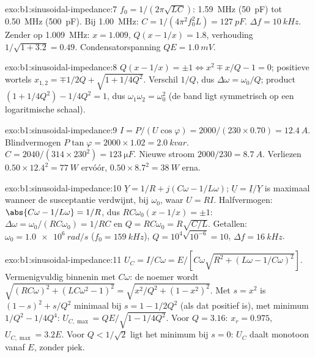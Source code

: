 \begin{solution}{exo:b1:sinusoidal-impedance:7}
$f_0 = 1/(2\pi\sqrt{LC})$: \qty{1.59}{MHz} (\qty{50}{pF}) tot \qty{0.50}{MHz}
(\qty{500}{pF}). Bij \qty{1.00}{MHz}: $C = 1/(4\pi^2f_0^2L) = \qty{127}{pF}$.
$\Delta f = \qty{10}{kHz}$. Zender op \qty{1.009}{MHz}: $x = 1.009$,
$Q(x - 1/x) = 1.8$, verhouding $1/\sqrt{1 + 3.2} = 0.49$. Condensatorspanning
$QE = \qty{1.0}{mV}$.
\end{solution}

\begin{solution}{exo:b1:sinusoidal-impedance:8}
$Q(x - 1/x) = \pm1 \Leftrightarrow x^2 \mp x/Q - 1 = 0$; positieve wortels
$x_{1,2} = \mp 1/2Q + \sqrt{1 + 1/4Q^2}$. Verschil $1/Q$, dus
$\Delta\omega = \omega_0/Q$; product $(1 + 1/4Q^2) - 1/4Q^2 = 1$, dus
$\omega_1\omega_2 = \omega_0^2$ (de band ligt symmetrisch op een logaritmische schaal).
\end{solution}

\begin{solution}{exo:b1:sinusoidal-impedance:9}
$I = P/(U\cos\varphi) = 2000/(230 \times 0.70) = \qty{12.4}{A}$. Blindvermogen
$P\tan\varphi = 2000 \times 1.02 = \qty{2.0}{kvar}$. $C = 2040/(314
\times 230^2) = \qty{123}{\micro F}$. Nieuwe stroom $2000/230 = \qty{8.7}{A}$.
Verliezen $0.50 \times 12.4^2 = \qty{77}{W}$ ervóór, $0.50 \times 8.7^2 =
\qty{38}{W}$ erna.
\end{solution}

\begin{solution}{exo:b1:sinusoidal-impedance:10}
$\underline Y = 1/R + j(C\omega - 1/L\omega)$; $\underline U = \underline I/
\underline Y$ is maximaal wanneer de susceptantie verdwijnt, bij $\omega_0$,
waar $U = RI$. Halfvermogen: $\abs{C\omega - 1/L\omega} = 1/R$, dus
$RC\omega_0(x - 1/x) = \pm1$: $\Delta\omega = \omega_0/(RC\omega_0) = 1/RC$
en $Q = RC\omega_0 = R\sqrt{C/L}$. Getallen: $\omega_0 = \qty{1.0e6}{rad/s}$
($f_0 = \qty{159}{kHz}$), $Q = 10^4\sqrt{10^{-6}} = 10$, $\Delta f =
\qty{16}{kHz}$.
\end{solution}

\begin{solution}{exo:b1:sinusoidal-impedance:11}
$U_C = I/C\omega = E/[C\omega\sqrt{R^2 + (L\omega - 1/C\omega)^2}]$.
Vermenigvuldig binnenin met $C\omega$: de noemer wordt
$\sqrt{(RC\omega)^2 + (LC\omega^2 - 1)^2} =
\sqrt{x^2/Q^2 + (1 - x^2)^2}$. Met $s = x^2$ is $(1 - s)^2 + s/Q^2$
minimaal bij $s = 1 - 1/2Q^2$ (als dat positief is), met minimum $1/Q^2 - 1/4Q^4$:
$U_{C,\max} = QE/\sqrt{1 - 1/4Q^2}$. Voor $Q = 3.16$: $x_r = 0.975$,
$U_{C,\max} = 3.2E$. Voor $Q < 1/\sqrt2$ ligt het minimum bij $s = 0$: $U_C$
daalt monotoon vanaf $E$, zonder piek.
\end{solution}

